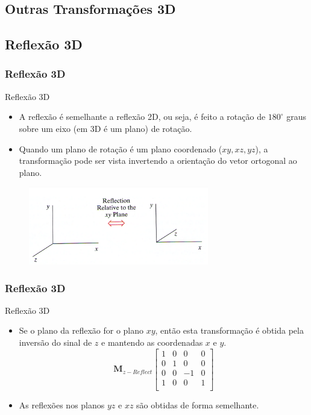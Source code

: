\documentclass{beamer}
\begin{document}
\begin{frame}
\section{Outras Transformações 3D}
\subsection{Reflexão 3D}
\frametitle{Reflexão 3D}
	\begin{block}{Reflexão 3D}
		\begin{itemize}
			\item A reflexão é semelhante a reflexão 2D, ou seja, é feito a rotação de $180^{\circ}$ graus sobre um eixo (em 3D é um plano) de rotação.
			\item Quando um plano de rotação é um plano coordenado ($xy,xz,yz$), a transformação pode ser vista invertendo a orientação do vetor ortogonal ao plano.
		\end{itemize}
	\end{block}
	
	\begin{figure}[!h]
			\begin{center}
			\includegraphics[width=0.7\textwidth]{Figures/Ref3D}
			\end{center}
	\end{figure}

\end{frame}

\begin{frame}
\frametitle{Reflexão 3D}
	\begin{block}{Reflexão 3D}
		\begin{itemize}
			\item Se o plano da reflexão for o plano $xy$, então esta transformação é obtida pela inversão do sinal de $z$ e mantendo as coordenadas $x$ e $y$.
			\begin{equation*}
				\textbf{M}_{z-Reflect}\begin{bmatrix}
					1	&	0	&	0	&	0 \\
					0	&	1	&	0	&	0 \\
					0	&	0	&	-1	&	0 \\
					1	&	0	&	0	&	1 \\
				\end{bmatrix}
			\end{equation*}
			\item As reflexões nos planos $yz$ e $xz$ são obtidas de forma semelhante. 
		\end{itemize}
	\end{block}
\end{frame}
\end{document}
